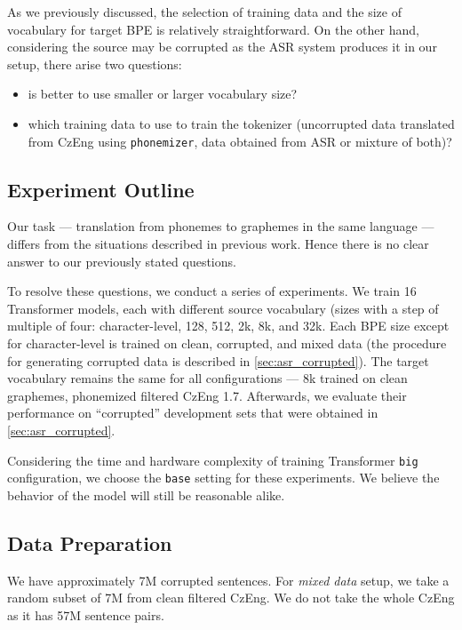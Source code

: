 As we previously discussed, the selection of training data and the size of vocabulary for target BPE is relatively straightforward. On the other hand, considering the source may be corrupted as the ASR system produces it in our setup, there arise two questions: 

\begin{itemize}
	\item is better to use smaller or larger vocabulary size?
	\item which training data to use to train the tokenizer (uncorrupted data translated from CzEng using \texttt{phonemizer}, data obtained from ASR or mixture of both)?
\end{itemize}



\subsection{Experiment Outline}
Our task --- translation from phonemes to graphemes in the same language --- differs from the situations described in previous work. Hence there is no clear answer to our previously stated questions.

To resolve these questions, we conduct a series of experiments. We train 16 Transformer models, each with different source vocabulary (sizes with a step of multiple of four: character-level, 128, 512, 2k, 8k, and 32k. Each BPE size except for character-level is trained on clean, corrupted, and mixed data (the procedure for generating corrupted data is described in \cref{sec:asr_corrupted}). The target vocabulary remains the same for all configurations --- 8k trained on clean graphemes, phonemized filtered CzEng 1.7. Afterwards, we evaluate their performance on ``corrupted'' development sets that were obtained in \cref{sec:asr_corrupted}.

Considering the time and hardware complexity of training Transformer \texttt{big} configuration, we choose the \texttt{base} setting for these experiments. We believe the behavior of the model will still be reasonable alike.

\subsection{Data Preparation}
 We have approximately 7M corrupted sentences. For \textit{mixed data} setup, we take a random subset of 7M from clean filtered CzEng. We do not take the whole CzEng as it has 57M sentence pairs. 

